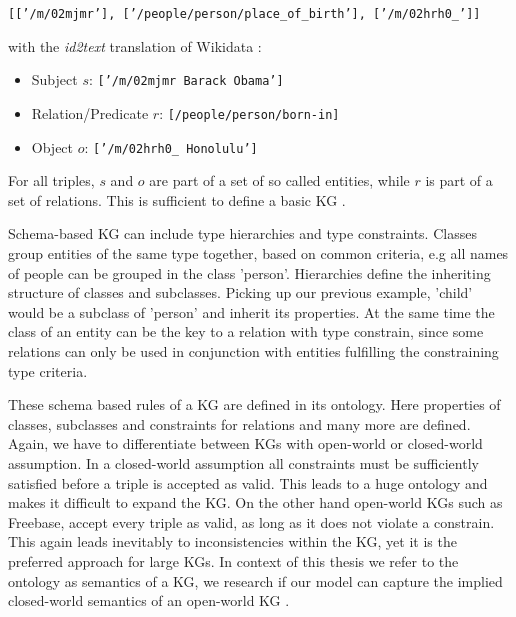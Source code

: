 \begin{center}
    \texttt{[['/m/02mjmr'], ['/people/person/place\_of\_birth'], ['/m/02hrh0\_']]}
\end{center}



with the \textit{id2text} translation of Wikidata \cite{vrandevcic2014wikidata}:
\begin{itemize}
    \item Subject $s$:   \texttt{['/m/02mjmr Barack Obama']}
    \item Relation/Predicate $r$:    \texttt{[/people/person/born-in]}
    \item Object $o$:     \texttt{['/m/02hrh0\_ Honolulu']}
\end{itemize}


For all triples, $s$ and $o$ are part of a set of so called entities, while $r$ is part of a set of relations. This is sufficient to define a basic KG \cite{nickel_review_2016}.

Schema-based KG can include type hierarchies and type constraints. Classes group entities of the same type together, based on common criteria, e.g all names of people can be grouped in the class 'person'. Hierarchies define the inheriting structure of classes and subclasses. Picking up our previous example, 'child' would be a subclass of 'person' and inherit its properties. At the same time the class of an entity can be the key to a relation with type constrain, since some relations can only be used in conjunction with entities fulfilling the constraining type criteria.

These schema based rules of a KG are defined in its ontology. Here properties of classes, subclasses and constraints for relations and many more are defined. Again, we have to differentiate between KGs with open-world or closed-world assumption. In a closed-world assumption all constraints must be sufficiently satisfied before a triple is accepted as valid. This leads to a huge ontology and makes it difficult to expand the KG. On the other hand open-world KGs such as Freebase, accept every triple as valid, as long as it does not violate a constrain. This again leads inevitably to inconsistencies within the KG, yet it is the preferred approach for large KGs. In context of this thesis we refer to the ontology as semantics of a KG, we research if our model can capture the implied closed-world semantics of an open-world KG \cite{nickel_review_2016}.

